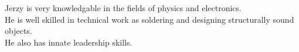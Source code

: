 \documentclass[class=report, crop=false]{standalone}
\begin{document}
Jerzy is very knowledgable in the fields of physics and electronics. \\
He is well skilled in technical work as soldering and designing structurally sound objects. \\
He also has innate leadership skills.
\end{document}
